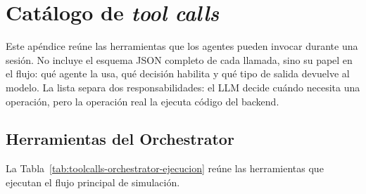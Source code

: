 \chapter{Catálogo de \textit{tool calls}}
\label{ap:toolcalls}

Este apéndice reúne las herramientas que los agentes pueden invocar durante
una sesión. No incluye el esquema JSON completo de cada llamada, sino su papel en
el flujo: qué agente la usa, qué decisión habilita y qué tipo de salida devuelve
al modelo. La lista separa dos responsabilidades: el LLM decide cuándo
necesita una operación, pero la operación real la ejecuta código del backend.

\section{Herramientas del Orchestrator}

La Tabla~\ref{tab:toolcalls-orchestrator-ejecucion} reúne las herramientas que
ejecutan el flujo principal de simulación.

